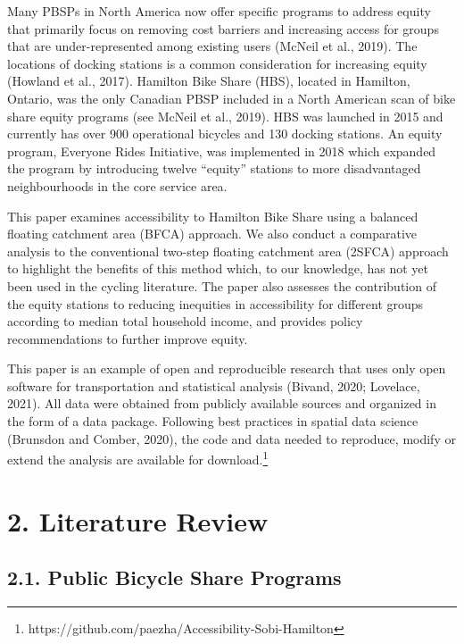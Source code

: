 \documentclass[]{elsarticle} %
\begin{document}
Many PBSPs in North America now offer specific programs to address
equity that primarily focus on removing cost barriers and increasing
access for groups that are under-represented among existing users
(McNeil et al., 2019). The locations of docking stations is a common
consideration for increasing equity (Howland et al., 2017). Hamilton
Bike Share (HBS), located in Hamilton, Ontario, was the only Canadian
PBSP included in a North American scan of bike share equity programs
(see McNeil et al., 2019). HBS was launched in 2015 and currently has
over 900 operational bicycles and 130 docking stations. An equity
program, Everyone Rides Initiative, was implemented in 2018 which
expanded the program by introducing twelve ``equity'' stations to more
disadvantaged neighbourhoods in the core service area.

This paper examines accessibility to Hamilton Bike Share using a
balanced floating catchment area (BFCA) approach. We also conduct a
comparative analysis to the conventional two-step floating catchment
area (2SFCA) approach to highlight the benefits of this method which, to
our knowledge, has not yet been used in the cycling literature. The
paper also assesses the contribution of the equity stations to reducing
inequities in accessibility for different groups according to median
total household income, and provides policy recommendations to further
improve equity.

This paper is an example of open and reproducible research that uses
only open software for transportation and statistical analysis (Bivand,
2020; Lovelace, 2021). All data were obtained from publicly available
sources and organized in the form of a data package. Following best
practices in spatial data science (Brunsdon and Comber, 2020), the code
and data needed to reproduce, modify or extend the analysis are
available for download.\footnote{https://github.com/paezha/Accessibility-Sobi-Hamilton}

\hypertarget{literature-review}{%
\section{2. Literature Review}\label{literature-review}}

\hypertarget{public-bicycle-share-programs}{%
\subsection{2.1. Public Bicycle Share
Programs}\label{public-bicycle-share-programs}}
\end{document}
